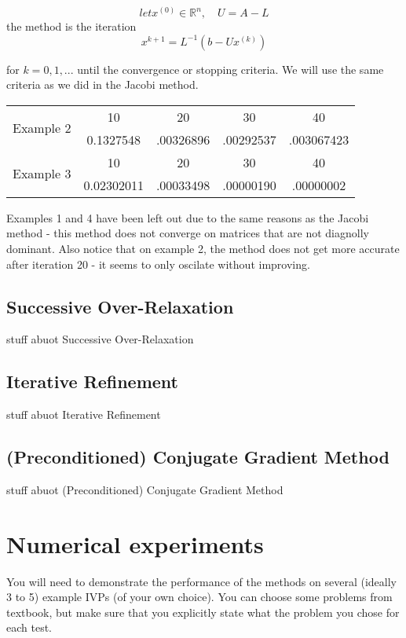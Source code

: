 \documentclass[11pt]{article}	%
\begin{document}
\begin{equation}\label{eq:jacobi-eq-1}
    let x^{(0)}\in {\mathbb R}^n, \quad U = A - L
\end{equation}
the method is the iteration
\begin{equation}\label{eq:jacobi-eq-1}
    x^{k+1} = L^{-1}(b - Ux^{(k)})
\end{equation}

for $k = 0, 1, ...$ until the convergence or stopping criteria. We will use the same criteria as we did in the Jacobi method.

\begin{center}
    \begin{tabular}{||c|c|c|c|c||}
        \hline
        \multirow{2}{5em}{Example 2} & 10 & 20 & 30 & 40 \\ [.25em]
        & 0.1327548 & .00326896 & .00292537 & .003067423 \\ [.25em]
        \hline \hline
        \multirow{2}{5em}{Example 3} & 10 & 20 & 30 & 40 \\ [.25em]
        & 0.02302011 & .00033498 & .00000190 & .00000002 \\ [.25em]
        \hline
    \end{tabular}
\end{center}
Examples 1 and 4 have been left out due to the same reasons as the Jacobi method - this method does not converge on matrices that are not diagnolly dominant. Also notice that on example 2, the method does not get more accurate after iteration 20 - it seems to only oscilate without improving.

\subsection{Successive Over-Relaxation}
stuff abuot Successive Over-Relaxation

\subsection{Iterative Refinement}
stuff abuot Iterative Refinement

\subsection{(Preconditioned) Conjugate Gradient Method}
stuff abuot (Preconditioned) Conjugate Gradient Method

\section{Numerical experiments}
You will need to demonstrate the performance
of the methods on several (ideally 3 to 5) example IVPs (of your own choice).
You can choose some problems from textbook, but make sure that you
explicitly state what the problem you chose for each test.
\end{document}
